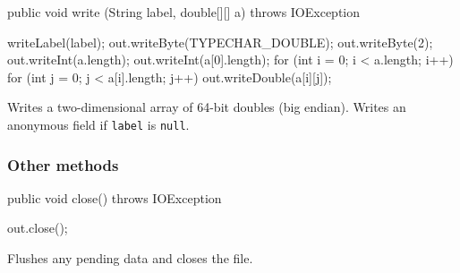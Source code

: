 \begin{code}

   public void write (String label, double[][] a) throws IOException \begin{hide} {
      writeLabel(label);
      out.writeByte(TYPECHAR_DOUBLE);
      out.writeByte(2);
      out.writeInt(a.length);
      out.writeInt(a[0].length);
      for (int i = 0; i < a.length; i++)
         for (int j = 0; j < a[i].length; j++)
            out.writeDouble(a[i][j]);
   }
   \end{hide}
\end{code}
\begin{tabb}
Writes a two-dimensional array of 64-bit doubles (big endian).
Writes an anonymous field if \texttt{label} is \texttt{null}.
\end{tabb}


\subsubsection*{Other methods}
\begin{code}

   public void close() throws IOException \begin{hide} {
      out.close();
   }
   \end{hide}
\end{code}
\begin{tabb}
Flushes any pending data and closes the file.
\end{tabb}

\begin{code}\begin{hide}
}
\end{hide}\end{code}
